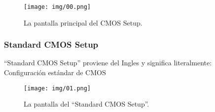 \documentclass[12pt,oneside,a4paper]{article}
\begin{document}
			\begin{figure}[H]
				\centering
					\texttt{[image: img/00.png]}
				\caption{La pantalla principal del CMOS Setup.}
			\end{figure}

		\subsubsection{Standard CMOS Setup}{\label{sub:Standard cmos setup}}
	
			``Standard CMOS Setup'' proviene del Ingles y significa literalmente:
			Configuración estándar de CMOS
			\begin{figure}[H]
				\centering
					\texttt{[image: img/01.png]}
				\caption{La pantalla del ``Standard CMOS Setup''.}
			\end{figure}
			
\end{document}
